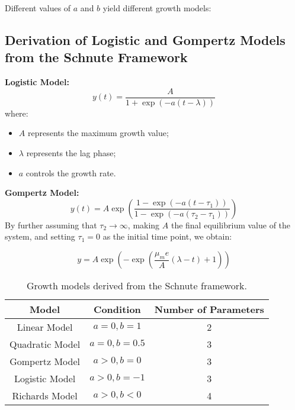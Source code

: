 \documentclass{article}
\begin{document}
Different values of \( a \) and \( b \) yield different growth models:

\subsection{Derivation of Logistic and Gompertz Models from the Schnute Framework}

\textbf{Logistic Model:}
\begin{equation}
  y(t) = \frac{A}{1 + \exp(-a(t - \lambda))}
\end{equation}
where:
\begin{itemize}
    \item \( A \) represents the maximum growth value;
    \item \( \lambda \) represents the lag phase;
    \item \( a \) controls the growth rate.
\end{itemize}

\textbf{Gompertz Model:}
\begin{equation}
  y(t) = A \exp \left( \frac{1 - \exp(-a(t - \tau_1))}{1 - \exp(-a(\tau_2 - \tau_1))} \right)
\end{equation}
By further assuming that \( \tau_2 \to \infty \), making \( A \) the final equilibrium value of the system, and setting \( \tau_1 = 0 \) as the initial time point, we obtain:

\begin{equation}
  y = A \exp \left(-\exp \left( \frac{\mu_m e}{A} (\lambda - t) + 1 \right) \right)
\end{equation}
\begin{table}[h]
    \centering
    \begin{tabular}{|c|c|c|}
        \hline
        \textbf{Model} & \textbf{Condition} & \textbf{Number of Parameters} \\
        \hline
        Linear Model & \( a = 0, b = 1 \) & 2 \\
        Quadratic Model & \( a = 0, b = 0.5 \) & 3 \\
        Gompertz Model & \( a > 0, b = 0 \) & 3 \\
        Logistic Model & \( a > 0, b = -1 \) & 3 \\
        Richards Model & \( a > 0, b < 0 \) & 4 \\
        \hline
    \end{tabular}
    \caption{Growth models derived from the Schnute framework.}
\end{table}
\end{document}
